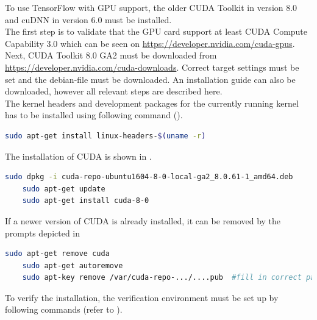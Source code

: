 To use TensorFlow with GPU support, the older CUDA Toolkit in version 8.0 and cuDNN in version 6.0 must be installed. \\

The first step is to validate that the GPU card support at least CUDA Compute Capability 3.0 which can be seen on \url{https://developer.nvidia.com/cuda-gpus}. \\

Next, CUDA Toolkit 8.0 GA2 must be downloaded from \url{https://developer.nvidia.com/cuda-downloads}. Correct target settings must be set and the debian-file must be downloaded. An installation guide can also be downloaded, however all relevant steps are described here. \\

The kernel headers and development packages for the currently running kernel has to be installed using following command ().

\begin{minipage}{\linewidth}
\begin{lstlisting}[caption=Installation of linux-headers, label=list:linuxheaders, language=bash]
	sudo apt-get install linux-headers-$(uname -r)
\end{lstlisting}
\end{minipage}

The installation of CUDA is shown in .

\begin{minipage}{\linewidth}
\begin{lstlisting}[caption=Installation of CUDA, label=list:cuda, language=bash]
	sudo dpkg -i cuda-repo-ubuntu1604-8-0-local-ga2_8.0.61-1_amd64.deb
	sudo apt-get update
	sudo apt-get install cuda-8-0
\end{lstlisting}
\end{minipage}

If a newer version of CUDA is already installed, it can be removed by the prompts depicted in 

\begin{minipage}{\linewidth}
\begin{lstlisting}[caption=Removing newer CUDA version, label=list:cudaUninstall, language=bash]
	sudo apt-get remove cuda
	sudo apt-get autoremove
	sudo apt-key remove /var/cuda-repo-.../....pub	#fill in correct path/file
\end{lstlisting}
\end{minipage}

To verify the installation, the verification environment must be set up by following commands (refer to ). 

